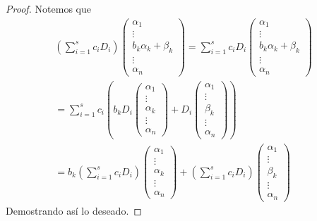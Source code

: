 \documentclass[12pt,a4paper]{book}
\newcommand{\parentesis}[1]{\left(#1\right)}
\begin{document}
    \begin{proof}
        Notemos que
        \begin{gather*}
        \parentesis{\sum_{i = 1}^{s}c_{i}D_{i}}
        \begin{pmatrix}
            \alpha_{1}\\
            \vdots\\
            b_{k}\alpha_{k} + \beta_{k}\\
            \vdots\\
            \alpha_{n}
        \end{pmatrix} = \sum_{i = 1}^{s}c_{i}D_{i}
        \begin{pmatrix}
            \alpha_{1}\\
            \vdots\\
            b_{k}\alpha_{k} + \beta_{k}\\
            \vdots\\
            \alpha_{n}
        \end{pmatrix}\\
        = \sum_{i = 1}^{s}c_{i} \parentesis{b_{k} D_{i}
        \begin{pmatrix}
            \alpha_{1}\\
            \vdots\\
            \alpha_{k}\\
            \vdots\\
            \alpha_{n}
        \end{pmatrix} + D_{i} 
        \begin{pmatrix}
            \alpha_{1}\\
            \vdots\\
            \beta_{k}\\
            \vdots\\
            \alpha_{n}
        \end{pmatrix}}\\
        = b_{k} \parentesis{\sum_{i = 1}^{s}c_{i}D_{i}}
        \begin{pmatrix}
             \alpha_{1}\\
             \vdots\\
             \alpha_{k}\\
             \vdots\\
             \alpha_{n}
        \end{pmatrix} + \parentesis{\sum_{i = 1}^{s}c_{i}D_{i}}
        \begin{pmatrix}
            \alpha_{1}\\
            \vdots\\
            \beta_{k}\\
            \vdots\\
            \alpha_{n}
        \end{pmatrix}   
        \end{gather*}
        Demostrando así lo deseado.
    \end{proof}
\end{document}
